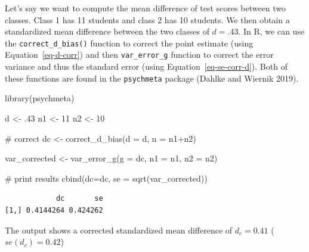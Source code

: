 \documentclass[
  letterpaper,
  DIV=11,
  numbers=noendperiod]{scrreprt}
\newenvironment{Shaded}{}{}
\newcommand{\AttributeTok}[1]{\textcolor[rgb]{0.00,0.34,0.68}{#1}}
\newcommand{\CommentTok}[1]{\textcolor[rgb]{0.54,0.53,0.53}{#1}}
\newcommand{\DecValTok}[1]{\textcolor[rgb]{0.69,0.50,0.00}{#1}}
\newcommand{\FunctionTok}[1]{\textcolor[rgb]{0.39,0.29,0.61}{#1}}
\newcommand{\NormalTok}[1]{\textcolor[rgb]{0.12,0.11,0.11}{#1}}
\newcommand{\OtherTok}[1]{\textcolor[rgb]{0.00,0.43,0.16}{#1}}
\newcommand{\SpecialCharTok}[1]{\textcolor[rgb]{0.24,0.68,0.91}{#1}}
\begin{document}
\begin{tcolorbox}[enhanced jigsaw, toptitle=1mm, titlerule=0mm, arc=.35mm, breakable, colframe=quarto-callout-note-color-frame, title={Applied Example in R}, opacitybacktitle=0.6, opacityback=0, colbacktitle=quarto-callout-note-color!10!white, coltitle=black, bottomtitle=1mm, colback=white, bottomrule=.15mm, rightrule=.15mm, toprule=.15mm, leftrule=.75mm, left=2mm]

Let's say we want to compute the mean difference of test scores between
two classes. Class 1 has 11 students and class 2 has 10 students. We
then obtain a standardized mean difference between the two classes of
\(d=.43\). In R, we can use the \texttt{correct\_d\_bias()} function to
correct the point estimate (using Equation~\ref{eq-d-corr}) and then
\texttt{var\_error\_g} function to correct the error variance and thus
the standard error (using Equation~\ref{eq-se-corr-d}). Both of these
functions are found in the \texttt{psychmeta} package (Dahlke and
Wiernik 2019).

\begin{Shaded}
\begin{Highlighting}[]
\FunctionTok{library}\NormalTok{(psychmeta)}

\NormalTok{d }\OtherTok{\textless{}{-}}\NormalTok{ .}\DecValTok{43}
\NormalTok{n1 }\OtherTok{\textless{}{-}} \DecValTok{11}
\NormalTok{n2 }\OtherTok{\textless{}{-}} \DecValTok{10}

\CommentTok{\# correct}
\NormalTok{dc }\OtherTok{\textless{}{-}} \FunctionTok{correct\_d\_bias}\NormalTok{(}\AttributeTok{d =}\NormalTok{ d,}
                     \AttributeTok{n =}\NormalTok{ n1}\SpecialCharTok{+}\NormalTok{n2)}

\NormalTok{var\_corrected }\OtherTok{\textless{}{-}} \FunctionTok{var\_error\_g}\NormalTok{(}\AttributeTok{g =}\NormalTok{ dc, }
                             \AttributeTok{n1 =}\NormalTok{ n1, }
                             \AttributeTok{n2 =}\NormalTok{ n2)}

\CommentTok{\# print results}
\FunctionTok{cbind}\NormalTok{(}\AttributeTok{dc=}\NormalTok{dc, }\AttributeTok{se =} \FunctionTok{sqrt}\NormalTok{(var\_corrected))}
\end{Highlighting}
\end{Shaded}

\begin{verbatim}
            dc       se
[1,] 0.4144264 0.424262
\end{verbatim}

The output shows a corrected standardized mean difference of
\(d_c = 0.41\) (\(se(d_c) = 0.42\))

\end{tcolorbox}
\end{document}
